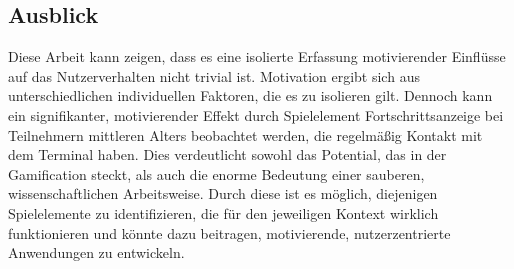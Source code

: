 \subsection{Ausblick}
Diese Arbeit kann zeigen, dass es eine isolierte Erfassung motivierender Einflüsse auf das Nutzerverhalten nicht trivial ist. Motivation ergibt sich aus unterschiedlichen individuellen Faktoren, die es zu isolieren gilt. Dennoch kann ein signifikanter, motivierender Effekt durch Spielelement Fortschrittsanzeige bei Teilnehmern mittleren Alters beobachtet werden, die regelmäßig Kontakt mit dem Terminal haben. Dies verdeutlicht sowohl das Potential, das in der Gamification steckt, als auch die enorme Bedeutung einer sauberen, wissenschaftlichen Arbeitsweise. Durch diese ist es möglich, diejenigen Spielelemente zu identifizieren, die für den jeweiligen Kontext wirklich funktionieren und könnte dazu beitragen, motivierende, nutzerzentrierte Anwendungen zu entwickeln.